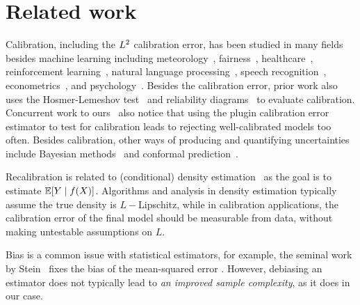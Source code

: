 \section{Related work}

Calibration, including the $L^2$ calibration error, has been studied in many fields besides machine learning including meteorology~\cite{murphy1973vector, murphy1977reliability, degroot1983forecasters,gneiting2005weather, brocker2009decomposition}, fairness~\cite{johnson2018multicalibration, liu2019implicit}, healthcare~\cite{jiang2012calibrating, crowson2017calibration, harrell1996prognostic, yadlowsky2019calibration}, reinforcement learning~\cite{malik2019calibrated}, natural language processing~\cite{nguyen2015posterior, card2018calibration}, speech recognition~\cite{dong2011calibration}, econometrics~\cite{gneiting2007probabilistic}, and psychology~\cite{lichtenstein1982calibration}.
Besides the calibration error, prior work also uses the Hosmer-Lemeshov test~\cite{hosmer1980goodness} and reliability diagrams~\cite{degroot1983forecasters, brocker2007reliability} to evaluate calibration.
Concurrent work to ours~\cite{widmann2019calibration} also notice that using the plugin calibration error estimator to test for calibration leads to rejecting well-calibrated models too often.
Besides calibration, other ways of producing and quantifying uncertainties include Bayesian methods~\cite{gelman1995bayesian} and conformal prediction~\cite{shafer2008tutorial, lei2016distribution}.

Recalibration is related to (conditional) density estimation~\cite{wasserman2019, parzen1962} as the goal is to estimate $\mathbb{E}[Y \mid f(X)]$.
Algorithms and analysis in density estimation typically assume the true density is $L-$Lipschitz, while in calibration applications, the calibration error of the final model should be measurable from data, without making untestable assumptions on $L$.


Bias is a common issue with statistical estimators, for example, the seminal work by Stein~\cite{stein81sure} fixes the bias of the mean-squared error . However, debiasing an estimator does not typically lead to \emph{an improved sample complexity}, as it does in our case.

